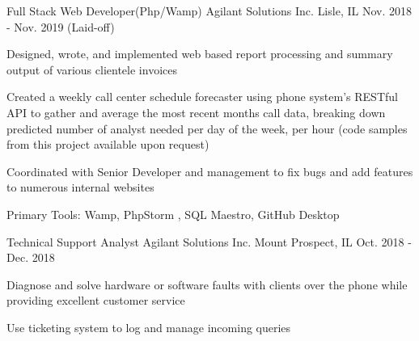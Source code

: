 


\begin{cventries}



\cventry
{ Full Stack Web Developer(Php/Wamp)} %
{Agilant Solutions Inc.} %
{Lisle, IL} %
{Nov. 2018 - Nov. 2019 (Laid-off)} %
{ %
\begin{cvitems}
\item {Designed, wrote, and implemented web based report processing and summary output of various clientele invoices}
\item {Created a weekly call center schedule forecaster using phone system's RESTful API to gather and average the most recent months call data, breaking down predicted number of analyst needed per day of the week, per hour (code samples from this project available upon request)}
\item {Coordinated with Senior Developer and management to fix bugs and add features to numerous internal websites}
\item {Primary Tools: Wamp, PhpStorm , SQL Maestro, GitHub Desktop}
\end{cvitems}
}

\cventry
{Technical Support Analyst} %
{Agilant Solutions Inc.} %
{Mount Prospect, IL} %
{Oct. 2018 - Dec. 2018} %
{ %
\begin{cvitems}
\item {Diagnose and solve hardware or software faults with clients over the phone while providing excellent customer service}
\item {Use ticketing system to log and manage incoming queries}
\end{cvitems}
}



\end{cventries}